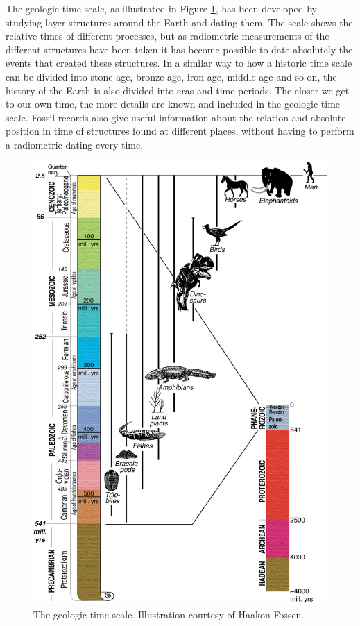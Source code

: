 \documentclass[a4paper,12pt]{report}
\begin{document}
The geologic time scale, as illustrated in Figure \ref{fig:geoTime}, has been developed by studying layer structures around the Earth and dating them. The scale shows the relative times of different processes, but as radiometric measurements of the different structures have been taken it has become possible to date absolutely the events that created these structures. In a similar way to how a historic time scale can be divided into stone age, bronze age, iron age, middle age and so on, the history of the Earth is also divided into eras and time periods. The closer we get to our own time, the more details are known and included in the geologic time scale. Fossil records also give useful information about the relation and absolute position in time of structures found at different places, without having to perform a radiometric dating every time.

\begin{figure}
 \includegraphics[width=\linewidth]{thesis/geo/english/time.jpg}
 \caption{The geologic time scale. Illustration courtesy of Haakon Fossen.}
 \label{fig:geoTime}
\end{figure}
\end{document}
